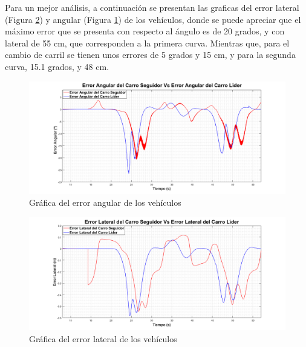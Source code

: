 \par Para un mejor análisis, a continuación se presentan las graficas del error lateral (Figura \ref{fig:elcl})  y angular (Figura \ref{fig:eacl}) de los vehículos, donde se puede apreciar que el máximo error que se presenta con respecto al ángulo es de 20 grados, y con lateral de 55 cm, que corresponden a la primera curva. Mientras que, para el cambio de carril se tienen unos errores de 5 grados y 15 cm, y para la segunda curva, 15.1 grados, y 48 cm.\\

\begin{figure}[H]
	\centering
		\includegraphics[scale=0.35]{Imagenes/eacl}
		\caption{Gráfica del error angular de los vehículos}
		\label{fig:eacl}
\end{figure}	

\begin{figure}[H]
	\centering
		\includegraphics[scale=0.35]{Imagenes/elcl}
		\caption{Gráfica del error lateral de los vehículos}
		\label{fig:elcl}
\end{figure}	

